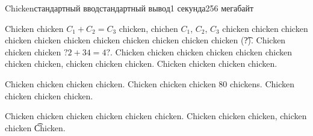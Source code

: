 \begin{problem}{Chicken}{стандартный ввод}{стандартный вывод}{1 секунда}{256 мегабайт}

Chicken chicken $C_1 + C_2 = C_3$ chicken, chichen $C_1$, $C_2$, $C_3$ chicken chicken chicken chicken chicken chicken chicken chicken chicken chicken chicken (\t{?}). Chicken chicken chicken $?2 + 34 = 4?$. Chicken chicken chicken chicken chicken chicken chicken chicken, chicken chicken chicken. Chicken chicken chicken chicken.


\InputFile
Chicken chicken chicken chicken. Chicken chicken chicken 80 chickens. Chicken chicken chicken chicken.


\OutputFile
Chicken chicken chicken chicken chicken chicken. Chicken chicken chicken, chicken chicken \t{Chicken}.

\Examples

\begin{example}
%
%
\end{example}

\end{problem}

